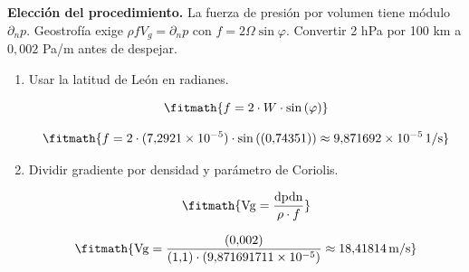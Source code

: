 \noindent\textbf{Elección del procedimiento.} La fuerza de presión por volumen tiene módulo $\partial_np$. Geostrofía exige $\rho fV_g=\partial_np$ con $f=2\Omega\sin\varphi$. Convertir 2 hPa por 100 km a $0{,}002$ Pa/m antes de despejar.

\begin{enumerate}

\item Usar la latitud de León en radianes.

\[\fitmath{f=2\cdot W\cdot \sin\left(\varphi\right)}\]

\[\fitmath{f=2\cdot (7{,}2921\times10^{-5})\cdot \sin\left((0{,}74351)\right)\approx 9{,}871692\times10^{-5}\,\mathrm{1/s}}\]

\item Dividir gradiente por densidad y parámetro de Coriolis.

\[\fitmath{\mathrm{Vg}=\frac{\mathrm{dpdn}}{\rho\cdot f}}\]

\[\fitmath{\mathrm{Vg}=\frac{(0{,}002)}{(1{,}1)\cdot (9{,}871691711\times10^{-5})}\approx 18{,}41814\,\mathrm{m/s}}\]

\end{enumerate}
